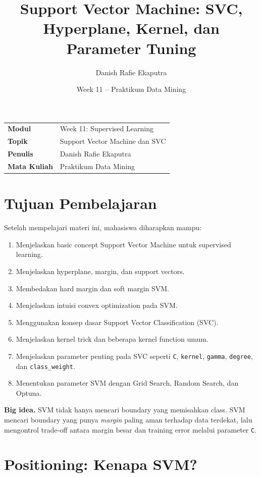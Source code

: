 \documentclass{article}
\title{Support Vector Machine: SVC, Hyperplane, Kernel, dan Parameter Tuning}
\author{Danish Rafie Ekaputra}
\date{Week 11 -- Praktikum Data Mining}
\newcommand{\theauthor}{Danish Rafie Ekaputra}
\newcommand{\code}[1]{\texttt{#1}}
\newcommand{\infobox}[2]{%
  \par\vspace{0.6em}
  \noindent\colorbox{#1}{%
    \begin{minipage}{0.96\textwidth}
    \vspace{0.65em}
    #2
    \vspace{0.65em}
    \end{minipage}}
  \par\vspace{0.8em}
}
\begin{document}
\maketitle

\noindent\begin{tabular}{@{}>{\bfseries}ll}
    Modul & Week 11: Supervised Learning\\
    Topik & Support Vector Machine dan SVC\\
    Penulis & \theauthor\\
    Mata Kuliah & Praktikum Data Mining
\end{tabular}

\section*{Tujuan Pembelajaran}

Setelah mempelajari materi ini, mahasiswa diharapkan mampu:

\begin{enumerate}[leftmargin=*]
    \item Menjelaskan basic concept Support Vector Machine untuk supervised learning.
    \item Menjelaskan hyperplane, margin, dan support vectors.
    \item Membedakan hard margin dan soft margin SVM.
    \item Menjelaskan intuisi convex optimization pada SVM.
    \item Menggunakan konsep dasar Support Vector Classification (SVC).
    \item Menjelaskan kernel trick dan beberapa kernel function umum.
    \item Menjelaskan parameter penting pada SVC seperti \code{C}, \code{kernel}, \code{gamma}, \code{degree}, dan \code{class\_weight}.
    \item Menentukan parameter SVM dengan Grid Search, Random Search, dan Optuna.
\end{enumerate}

\infobox{softBlue}{\textbf{Big idea.} SVM tidak hanya mencari boundary yang memisahkan class. SVM mencari boundary yang punya \textit{margin} paling aman terhadap data terdekat, lalu mengontrol trade-off antara margin besar dan training error melalui parameter \code{C}.}

\section{Positioning: Kenapa SVM?}
\end{document}
